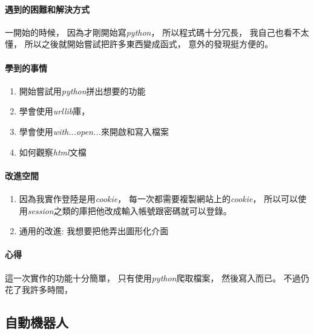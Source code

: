 \documentclass[12pt,oneside]{ctexart}
\begin{document}
\paragraph{ 遇到的困難和解決方式 }
\begin{adjustwidth}{2em}{0em}
    一開始的時候，
    因為才剛開始寫\textit{python}，
    所以程式碼十分冗長，
    我自己也看不太懂，
    所以之後就開始嘗試把許多東西變成函式，
    意外的發現挺方便的。
\end{adjustwidth}

\paragraph{學到的事情}
\begin{adjustwidth}{2em}{0em}
\begin{enumerate}
    \item 開始嘗試用\textit{python}拼出想要的功能
    \item 學會使用\textit{urllib}庫，
    \item 學會使用\textit{with...open...}來開啟和寫入檔案
    \item 如何觀察\textit{html}文檔
\end{enumerate}
\end{adjustwidth}

\paragraph{改進空間}
\begin{enumerate}
    \item 
        因為我實作登陸是用\textit{cookie}，
        每一次都需要複製網站上的\textit{cookie}，
        所以可以使用\textit{session}之類的庫把他改成輸入帳號跟密碼就可以登錄。
    \item 
        通用的改進: 我想要把他弄出圖形化介面
\end{enumerate}

\paragraph{心得}
\begin{adjustwidth}{2em}{0em}
    這一次實作的功能十分簡單，
    只有使用\textit{python}爬取檔案，
    然後寫入而已。
    不過仍花了我許多時間，
\end{adjustwidth}


\clearpage

\subsection{ 自動機器人 }
\end{document}
